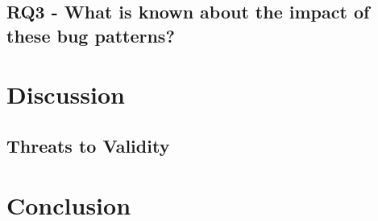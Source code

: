 \documentclass[conference]{IEEEtran}
\begin{document}
\subsection{RQ3 - What is known about the impact of these bug patterns?} %
\label{sub:item_rq3}

\section{Discussion}
\subsection{Threats to Validity}
\section{Conclusion}




%
%



%
%
\end{document}
